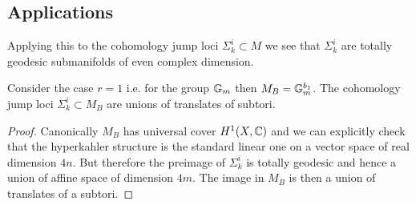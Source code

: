 \documentclass[12pt]{article}
\begin{document}
\subsection{Applications}

Applying this to the cohomology jump loci $\Sigma^i_k \subset M$ we see that $\Sigma^i_k$ are totally geodesic submanifolds of even complex dimension. 

\begin{cor}
Consider the case $r = 1$ i.e. for the group $\mathbb{G}_m$ then $M_B = \mathbb{G}_m^{b_1}$. The cohomology jump loci $\Sigma^i_k \subset M_B$ are unions of translates of subtori.
\end{cor}

\begin{proof}
Canonically $M_B$ has universal cover $H^1(X, \mathbb{C})$ and we can explicitly check that the hyperkahler structure is the standard linear one on a vector space of real dimension $4n$. But therefore the preimage of $\Sigma^i_k$ is totally geodesic and hence a union of affine space of dimension $4 m$. The image in $M_B$ is then a union of translates of a subtori.
\end{proof}
\end{document}
